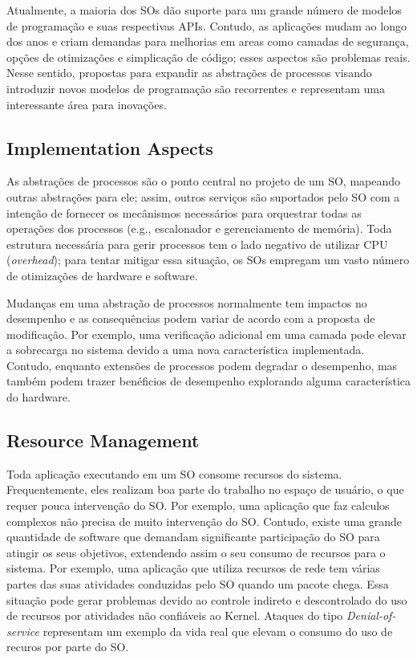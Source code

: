 Atualmente, a maioria dos SOs dão suporte para um grande número de modelos de
programação e suas respectivas APIs. Contudo, as aplicações mudam ao longo dos
anos e criam demandas para melhorias em areas como camadas de segurança, opções
de otimizações e simplicação de código; esses aspectos são problemas reais.
Nesse sentido, propostas para expandir as abstrações de processos visando
introduzir novos modelos de programação são recorrentes e representam uma
interessante área para inovações.

\subsection{Implementation Aspects}

As abstrações de processos são o ponto central no projeto de um SO, mapeando
outras abstrações para ele; assim, outros serviços são suportados pelo SO com a
intenção de fornecer os mecânismos necessários para orquestrar todas as
operações dos processos (e.g., escalonador e gerenciamento de memória). Toda
estrutura necessária para gerir processos tem o lado negativo de utilizar CPU
(\emph{overhead}); para tentar mitigar essa situação, os SOs empregam um vasto
número de otimizações de hardware e software.

Mudanças em uma abstração de processos normalmente tem impactos no desempenho e
as consequências podem variar de acordo com a proposta de modificação. Por
exemplo, uma verificação adicional em uma camada pode elevar a sobrecarga no
sistema devido a uma nova característica implementada. Contudo, enquanto
extensões de processos podem degradar o desempenho, mas também podem trazer
benéficios de desempenho explorando alguma característica do hardware.

\subsection{Resource Management}

Toda aplicação executando em um SO consome recursos do sistema. Frequentemente,
eles realizam boa parte do trabalho no espaço de usuário, o que requer pouca
intervenção do SO. Por exemplo, uma aplicação que faz calculos complexos não
precisa de muito intervenção do SO. Contudo, existe uma grande quantidade de
software que demandam significante participação do SO para atingir os seus
objetivos, extendendo assim o seu consumo de recursos para o sistema. Por
exemplo, uma aplicação que utiliza recursos de rede tem várias partes das suas
atividades conduzidas pelo SO quando um pacote chega. Essa situação pode gerar
problemas devido ao controle indireto e descontrolado do uso de recursos por
atividades não confiáveis ao Kernel. Ataques do tipo \emph{Denial-of-service}
representam um exemplo da vida real que elevam o consumo do uso de recuros por
parte do SO.

